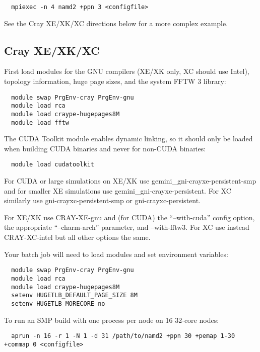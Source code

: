 \begin{verbatim}
  mpiexec -n 4 namd2 +ppn 3 <configfile>
\end{verbatim}

See the Cray XE/XK/XC directions below for a more complex example.

\subsection{Cray XE/XK/XC}

First load modules for the GNU compilers (XE/XK only, XC should use Intel),
topology information, huge page sizes, and the system FFTW 3 library:

\begin{verbatim}
  module swap PrgEnv-cray PrgEnv-gnu
  module load rca
  module load craype-hugepages8M
  module load fftw
\end{verbatim}

The CUDA Toolkit module enables dynamic linking, so it should only
be loaded when building CUDA binaries and never for non-CUDA binaries:

\begin{verbatim}
  module load cudatoolkit
\end{verbatim}

For CUDA or large simulations on XE/XK use gemini\_gni-crayxe-persistent-smp
and for smaller XE simulations use gemini\_gni-crayxe-persistent.  For XC
similarly use gni-crayxc-persistent-smp or gni-crayxc-persistent.

For XE/XK use CRAY-XE-gnu and (for CUDA) the ``--with-cuda'' config option,
the appropriate ``--charm-arch'' parameter, and --with-fftw3.  For XC
use instead CRAY-XC-intel but all other options the same.

Your batch job will need to load modules and set environment variables:

\begin{verbatim}
  module swap PrgEnv-cray PrgEnv-gnu
  module load rca
  module load craype-hugepages8M
  setenv HUGETLB_DEFAULT_PAGE_SIZE 8M
  setenv HUGETLB_MORECORE no
\end{verbatim}

To run an SMP build with one process per node on 16 32-core nodes:

\begin{verbatim}
  aprun -n 16 -r 1 -N 1 -d 31 /path/to/namd2 +ppn 30 +pemap 1-30 +commap 0 <configfile>
\end{verbatim}

